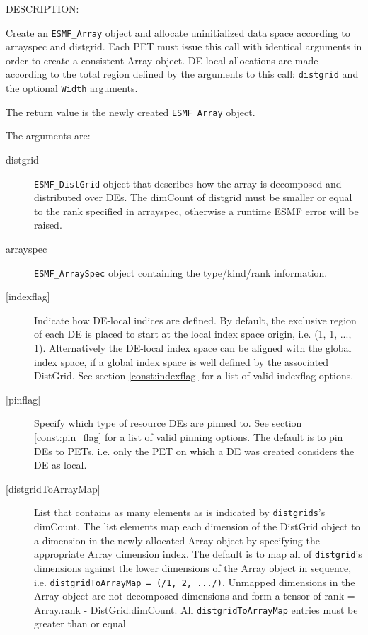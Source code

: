 {\sf DESCRIPTION:\\ }


   Create an {\tt ESMF\_Array} object and allocate uninitialized data space
   according to arrayspec and distgrid. Each PET must issue
   this call with identical arguments in order to create a consistent Array
   object. DE-local allocations are made according to the total region defined
   by the arguments to this call: {\tt distgrid} and the optional {\tt Width}
   arguments.
  
   The return value is the newly created {\tt ESMF\_Array} object.
  
   The arguments are:
   \begin{description}
   \item[distgrid]
   {\tt ESMF\_DistGrid} object that describes how the array is decomposed and
   distributed over DEs. The dimCount of distgrid must be smaller or equal
   to the rank specified in arrayspec, otherwise a runtime ESMF error will be
   raised.
   \item[arrayspec]
   {\tt ESMF\_ArraySpec} object containing the type/kind/rank information.
   \item[{[indexflag]}]
   Indicate how DE-local indices are defined. By default, the exclusive
   region of each DE is placed to start at the local index space origin,
   i.e. (1, 1, ..., 1). Alternatively the DE-local index space can be
   aligned with the global index space, if a global index space is well
   defined by the associated DistGrid. See section \ref{const:indexflag}
   for a list of valid indexflag options.
   \item[{[pinflag]}]
   Specify which type of resource DEs are pinned to. See section
   \ref{const:pin_flag} for a list of valid pinning options.
   The default is to pin DEs to PETs, i.e. only the PET on which a DE
   was created considers the DE as local.
   \item[{[distgridToArrayMap]}]
   List that contains as many elements as is indicated by
   {\tt distgrids}'s dimCount. The list elements map each dimension of
   the DistGrid object to a dimension in the newly allocated Array object
   by specifying the appropriate Array dimension index. The default is
   to map all of {\tt distgrid}'s dimensions against the lower dimensions
   of the Array object in sequence, i.e. {\tt distgridToArrayMap =
   (/1, 2, .../)}.
   Unmapped dimensions in the Array object are not decomposed dimensions
   and form a tensor of rank = Array.rank - DistGrid.dimCount.
   All {\tt distgridToArrayMap} entries must be greater than or equal

\end{description}
